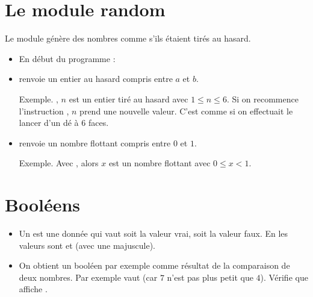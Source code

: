 \documentclass[11pt,class=report,crop=false]{standalone}
\begin{document}

\section*{Le module \og{}random\fg{}}

Le module  génère des nombres comme s'ils étaient tirés au hasard.

   
  \bigskip
  
\begin{itemize}
  \item En début du programme :\\
  \centerline{}
    
  \bigskip 
  \item {} renvoie un entier au hasard compris entre $a$ et $b$.
  
  Exemple. , $n$ est un entier tiré au hasard avec $1 \le n \le 6$.
  Si on recommence l'instruction , $n$ prend une nouvelle valeur. C'est comme si on effectuait le lancer d'un dé à $6$ faces.
     
     
  \bigskip
  \item {} renvoie un nombre flottant compris entre $0$ et $1$.  
  
  Exemple. Avec , alors $x$ est un nombre flottant avec $0 \le x < 1$.
\end{itemize}



\newpage

\section*{Booléens}


\sauteligne
\begin{itemize}
  \item Un  est une donnée qui vaut soit la valeur \og{}vrai\fg{}, soit la valeur \og{}faux\fg{}. En \Python{} les valeurs sont  et  (avec une majuscule).
     
  \bigskip
    
  \item On obtient un booléen par exemple comme résultat de la comparaison de deux nombres.
  Par exemple  vaut  (car $7$ n'est pas plus petit que $4$). 
  Vérifie que  affiche .
    
\end{itemize} 
     
\end{document}
